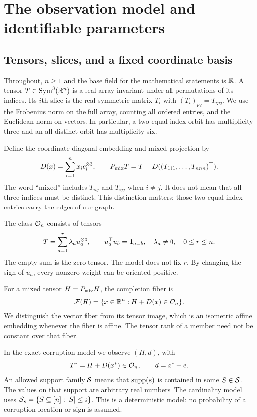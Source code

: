 \section{The observation model and identifiable parameters}\label{sec:model}
\subsection{Tensors, slices, and a fixed coordinate basis}
Throughout, $n\geq1$ and the base field for the mathematical statements is $\mathbb R$. A tensor $T\in\operatorname{Sym}^3(\mathbb R^n)$ is a real array invariant under all permutations of its indices. Its $i$th slice is the real symmetric matrix $T_i$ with $(T_i)_{pq}=T_{ipq}$. We use the Frobenius norm on the full array, counting all ordered entries, and the Euclidean norm on vectors. In particular, a two-equal-index orbit has multiplicity three and an all-distinct orbit has multiplicity six.

Define the coordinate-diagonal embedding and mixed projection by
\begin{equation}\label{eq:diagonal}
 D(x)=\sum_{i=1}^n x_i e_i^{\otimes3},\qquad
 P_{\rm mix}T=T-D((T_{111},\ldots,T_{nnn})^\top).
\end{equation}
The word ``mixed'' includes $T_{iij}$ and $T_{ijj}$ when $i\ne j$. It does not mean that all three indices must be distinct. This distinction matters: those two-equal-index entries carry the edges of our graph.

\begin{definition}\label{def:odeco}
The class $\mathcal O_n$ consists of tensors
\begin{equation}\label{eq:odeco}
 T=\sum_{a=1}^r\lambda_a u_a^{\otimes3},\qquad
 u_a^\top u_b=\mathbf 1_{a=b},\quad \lambda_a\ne0,\quad 0\le r\le n.
\end{equation}
The empty sum is the zero tensor. The model does not fix $r$. By changing the sign of $u_a$, every nonzero weight can be oriented positive.
\end{definition}
For a mixed tensor $H=P_{\rm mix}H$, the completion fiber is
\begin{equation}\label{eq:fiber-def}
 \mathcal F(H)=\{x\in\mathbb R^n:H+D(x)\in\mathcal O_n\}.
\end{equation}
We distinguish the vector fiber from its tensor image, which is an isometric affine embedding whenever the fiber is affine. The tensor rank of a member need not be constant over that fiber.

In the exact corruption model we observe $(H,d)$, with
\begin{equation}\label{eq:exact-model}
 T^*=H+D(x^*)\in\mathcal O_n,\qquad d=x^*+e.
\end{equation}
An allowed support family $\mathcal S$ means that $\operatorname{supp}(e)$ is contained in some $S\in\mathcal S$. The values on that support are arbitrary real numbers. The cardinality model uses $\mathcal S_s=\{S\subseteq[n]:|S|\le s\}$. This is a deterministic model: no probability of a corruption location or sign is assumed.

